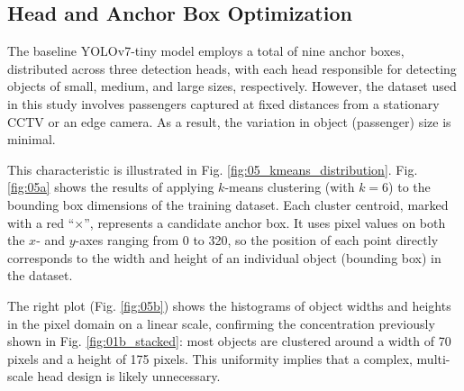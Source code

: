 \documentclass[journal,twoside,web]{ieeecolor}
\begin{document}



\subsection{Head and Anchor Box Optimization}
The baseline YOLOv7-tiny model employs a total of nine anchor boxes, distributed across three detection heads, with each head responsible for detecting objects of small, medium, and large sizes, respectively. However, the dataset used in this study involves 
passengers captured at fixed distances from a stationary \ac{CCTV} or an edge camera. As a result, the variation in object (passenger) size is minimal. 

This characteristic is illustrated in Fig. \ref{fig:05_kmeans_distribution}. Fig. \ref{fig:05a} shows the results of applying $k$-means clustering (with $k=6$) to the bounding box dimensions of the training dataset. Each cluster centroid, marked with a red “$\times$”, represents a candidate anchor box. It uses pixel values on both the $x$- and $y$-axes ranging from 0 to 320, so the position of each point directly corresponds to the width and height of an individual object (bounding box) in the dataset.

The right plot (Fig. \ref{fig:05b}) shows the histograms of object widths and heights in the pixel domain on a linear scale, confirming the concentration previously shown in Fig. \ref{fig:01b_stacked}: most objects are clustered around a width of 70 pixels and a height 
of 175 pixels. This uniformity implies that a complex, multi-scale head design is likely unnecessary.
\end{document}
